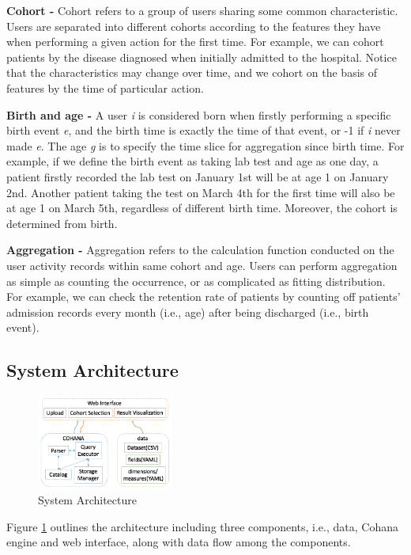 \documentclass[10pt,conference,letterpaper]{IEEEtran}
\begin{document}
\textbf{Cohort -} Cohort refers to a group of users sharing some common characteristic. Users are separated into different cohorts according to the features they have when performing a given action for the first time. For example, we can cohort patients by the disease diagnosed when initially admitted to the hospital. Notice that the characteristics may change over time, and we cohort on the basis of features by the time of particular action.

\textbf{Birth and age -} A user \emph{i} is considered born when firstly performing a specific birth event \emph{e}, and the birth time is exactly the time of that event, or -1 if \emph{i} never made \emph{e}. The age \emph{g} is to specify the time slice for aggregation since birth time. For example, if we define the birth event as taking lab test and age as one day, a patient firstly recorded the lab test on January 1st will be at age 1 on January 2nd. Another patient taking the test on March 4th for the first time will also be at age 1 on March 5th, regardless of different birth time. Moreover, the cohort is determined from birth.

\textbf{Aggregation -} Aggregation refers to the calculation function conducted on the user activity records within same cohort and age. Users can perform aggregation as simple as counting the occurrence, or as complicated as fitting distribution. For example, we can check the retention rate of patients by counting off patients' admission records every month (i.e., age) after being discharged (i.e., birth event).

\subsection{System Architecture}

\begin{figure}
    \centering
    \includegraphics[width=0.4\textwidth]{arch.png}
    \caption{System Architecture}
    \label{fig:sys_arch}
\end{figure}

Figure \ref{fig:sys_arch} outlines the architecture including three components, i.e., data, Cohana engine and web interface, along with data flow among the components.
\end{document}
